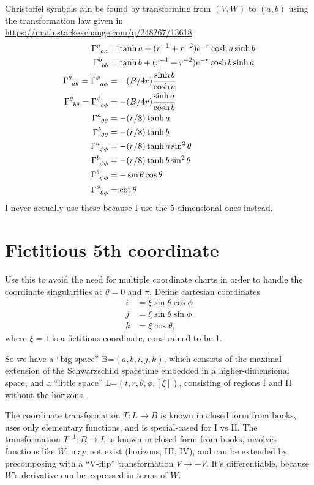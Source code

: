 \documentclass{article}
\begin{document}
Christoffel symbols can be found by transforming from $(V,W)$ to $(a,b)$ using the
transformation law given in \url{https://math.stackexchange.com/q/248267/13618}:
\begin{align*}
\Gamma\indices{^a_a_a} &= \tanh a + (r^{-1}+r^{-2})e^{-r}\cosh a\sinh b \\
\Gamma\indices{^b_b_b} &= \tanh b + (r^{-1}+r^{-2})e^{-r}\cosh b\sinh a \\
\Gamma\indices{^\theta_a_\theta} = \Gamma\indices{^\phi_a_\phi} &= -(B/4r)\frac{\sinh b}{\cosh a}  \\
\Gamma\indices{^\theta_b_\theta} = \Gamma\indices{^\phi_b_\phi} &= -(B/4r)\frac{\sinh a}{\cosh b}  \\
%
\Gamma\indices{^a_\theta_\theta} &= -(r/8)\tanh a\\
\Gamma\indices{^b_\theta_\theta} &= -(r/8)\tanh b\\
\Gamma\indices{^a_\phi_\phi} &= -(r/8) \tanh a\sin^2\theta\\
\Gamma\indices{^b_\phi_\phi} &= -(r/8) \tanh b\sin^2\theta\\
%
\Gamma\indices{^\theta_\phi_\phi} &= -\sin\theta \cos\theta   \\
\Gamma\indices{^\phi_\theta_\phi} &= \cot\theta   
\end{align*}
I never actually use these because I use the 5-dimensional ones instead.

\section{Fictitious 5th coordinate}
Use this to avoid the need for multiple coordinate charts in order to handle the coordinate singularities
at $\theta=0$ and $\pi$. Define cartesian coordinates
\begin{align*}
  i &= \xi \sin\theta \cos\phi \\
  j &= \xi \sin\theta \sin\phi \\
  k &= \xi \cos\theta ,
\end{align*}
where $\xi=1$ is a fictitious coordinate, constrained to be 1.

So we have a ``big space'' B=$(a,b,i,j,k)$, which consists of the maximal extension of the Schwarzschild
spacetime embedded in a higher-dimensional space, and a ``little space'' L=$(t,r,\theta,\phi,[\xi])$,
consisting of regions I and II without the horizons.

The coordinate transformation $T:L\to B$ is known in closed form from
books, uses only elementary functions, and is special-cased for I vs
II. The transformation $T^{-1}:B\to L$ is known in closed form from
books, involves functions like $W$, may not exist (horizons, III, IV),
and can be extended by precomposing with a ``V-flip'' transformation
$V\rightarrow -V$. It's differentiable, because $W$'s derivative can
be expressed in terms of $W$. 
\end{document}
